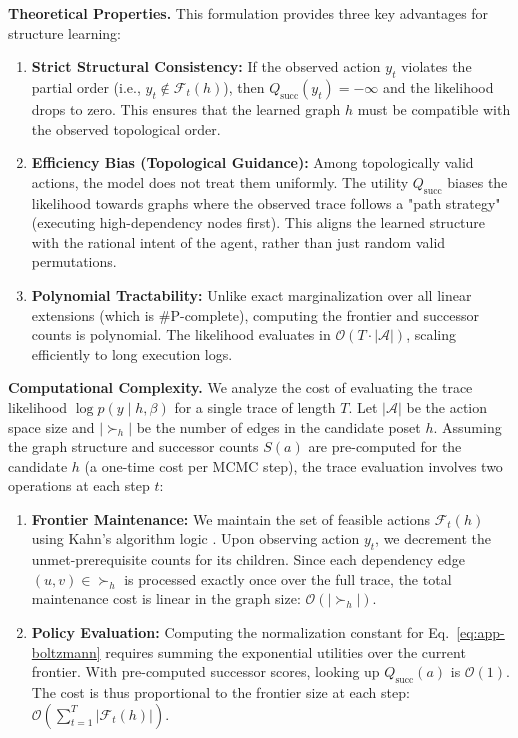 \documentclass{article}
\theoremstyle{plain}
\theoremstyle{definition}
\theoremstyle{remark}
\begin{document}
\noindent \textbf{Theoretical Properties.}
This formulation provides three key advantages for structure learning:
\begin{enumerate}
    \item \textbf{Strict Structural Consistency:} If the observed action $y_t$ violates the partial order (i.e., $y_t \notin \mathcal{F}_t(h)$), then $Q_{\text{succ}}(y_t) = -\infty$ and the likelihood drops to zero. This ensures that the learned graph $h$ must be compatible with the observed topological order.
    
    \item \textbf{Efficiency Bias (Topological Guidance):} Among topologically valid actions, the model does not treat them uniformly. The utility $Q_{\text{succ}}$ biases the likelihood towards graphs where the observed trace follows a "path strategy" (executing high-dependency nodes first). This aligns the learned structure with the rational intent of the agent, rather than just random valid permutations.
    
    \item \textbf{Polynomial Tractability:} Unlike exact marginalization over all linear extensions (which is \#P-complete), computing the frontier and successor counts is polynomial. The likelihood evaluates in $\mathcal{O}(T \cdot |\mathcal{A}|)$, scaling efficiently to long execution logs.
\end{enumerate}

\noindent \textbf{Computational Complexity.}
\label{app:complexity}
We analyze the cost of evaluating the trace likelihood $\log p(y\mid h, \beta)$ for a single trace of length $T$. Let $|\mathcal{A}|$ be the action space size and $|\succ_h|$ be the number of edges in the candidate poset $h$. Assuming the graph structure and successor counts $S(a)$ are pre-computed for the candidate $h$ (a one-time cost per MCMC step), the trace evaluation involves two operations at each step $t$:

\begin{enumerate}
    \item \textbf{Frontier Maintenance:} We maintain the set of feasible actions $\mathcal{F}_t(h)$ using Kahn's algorithm logic \citep{kahn162sorting}. Upon observing action $y_t$, we decrement the unmet-prerequisite counts for its children. Since each dependency edge $(u, v) \in \succ_h$ is processed exactly once over the full trace, the total maintenance cost is linear in the graph size: $\mathcal{O}(|\succ_h|)$.
    
    \item \textbf{Policy Evaluation:} Computing the normalization constant for Eq.~\ref{eq:app-boltzmann} requires summing the exponential utilities over the current frontier. With pre-computed successor scores, looking up $Q_{\text{succ}}(a)$ is $\mathcal{O}(1)$. The cost is thus proportional to the frontier size at each step: $\mathcal{O}(\sum_{t=1}^T |\mathcal{F}_t(h)|)$.
\end{enumerate}
\end{document}
